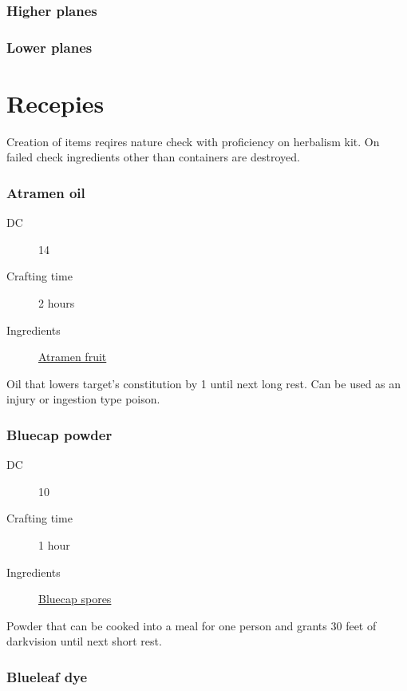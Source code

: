 \subsubsection{Higher planes}

\subsubsection{Lower planes}

\section{Recepies}

Creation of items reqires nature check with proficiency on herbalism kit. On failed check 
ingredients other than containers are destroyed.

\subsubsection{Atramen oil}
\label{Atramen oil}

\begin{description}
\item [DC] 14
\item [Crafting time] 2 hours
\item [Ingredients] \hyperref[Atramen]{Atramen fruit}
\end{description}

Oil that lowers target's constitution by 1 until next long rest. Can be used as an injury or ingestion type poison.

\subsubsection{Bluecap powder}
\label{Bluecap powder}

\begin{description}
\item [DC] 10
\item [Crafting time] 1 hour
\item [Ingredients] \hyperref[Bluecap]{Bluecap spores}
\end{description}

Powder that can be cooked into a meal for one person and grants 30 feet of darkvision until next short rest.

\subsubsection{Blueleaf dye}
\label{Blueleaf dye}

